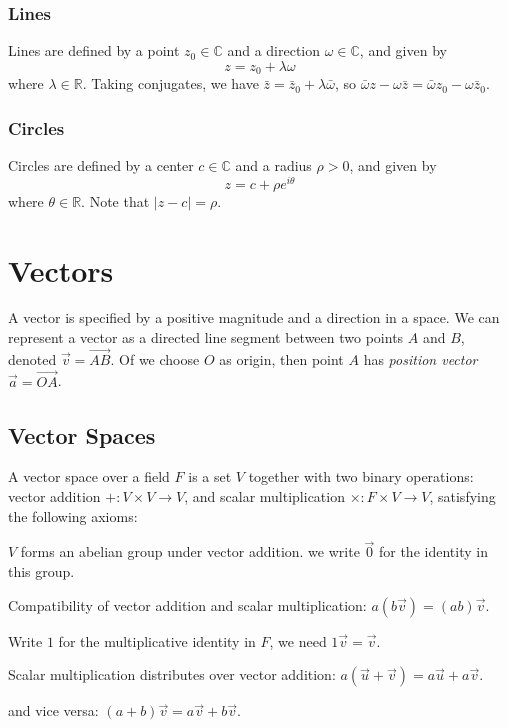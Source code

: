 \documentclass[12pt]{article}
\begin{document}
\subsubsection*{Lines}

Lines are defined by a point $z_{0} \in \mathbb{C}$ and a direction $\omega \in \mathbb{C}$,
and given by
\[
z = z_{0} + \lambda \omega
\]
where $\lambda \in \mathbb{R}$.
Taking conjugates, we have $\bar z = \bar z_{0} + \lambda \bar \omega$,
so $\bar \omega z - \omega \bar z = \bar \omega z_{0} - \omega \bar z_{0}$.

\subsubsection*{Circles}

Circles are defined by a center $c \in \mathbb{C}$ and a radius $\rho > 0$,
and given by
\[
z = c + \rho e^{i\theta}
\]
where $\theta \in \mathbb{R}$. Note that $|z - c| = \rho$.

\section{Vectors}

A vector is specified by a positive magnitude and a direction in a space.
We can represent a vector as a directed line segment between two points $A$ and $B$,
denoted $\vec v = \overrightarrow{AB}$.
Of we choose $O$ as origin, then point $A$ has \emph{position vector}
$\vec a = \overrightarrow{OA}$.

\subsection{Vector Spaces}

\begin{definition}
    A vector space over a field $F$ is a set $V$
    together with two binary operations:
    vector addition $+ : V \times V \to V$,
    and scalar multiplication $\times : F \times V \to V$,
    satisfying the following axioms:
    \begin{compactitem}
    \item $V$ forms an abelian group under vector addition.
        we write $\vec{0}$ for the identity in this group.
    \item Compatibility of vector addition and scalar multiplication:
        $a(b\vec{v}) = (ab)\vec{v}$.
    \item Write $1$ for the multiplicative identity in $F$, we need $1\vec{v} = \vec{v}$.
    \item Scalar multiplication distributes over vector addition: $a(\vec{u} + \vec{v}) = a\vec{u} + a\vec{v}$.
    \item and vice versa: $(a + b)\vec{v} = a\vec{v} + b\vec{v}$.
    \end{compactitem}
\end{definition}
\end{document}
